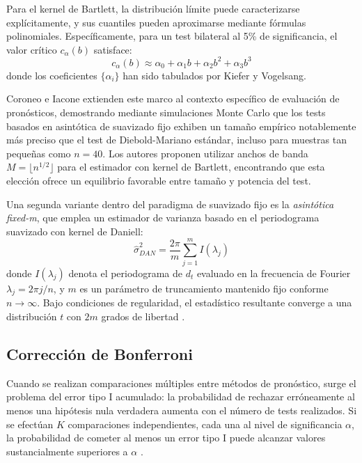 Para el kernel de Bartlett, la distribución límite puede caracterizarse explícitamente, y sus cuantiles pueden aproximarse mediante fórmulas polinomiales. Específicamente, para un test bilateral al 5\% de significancia, el valor crítico $c_\alpha(b)$ satisface:
\begin{equation}
c_\alpha(b) \approx \alpha_0 + \alpha_1 b + \alpha_2 b^2 + \alpha_3 b^3
\end{equation}
donde los coeficientes $\{\alpha_i\}$ han sido tabulados por Kiefer y Vogelsang.

Coroneo e Iacone \parencite{CoroneoIacone2020} extienden este marco al contexto específico de evaluación de pronósticos, demostrando mediante simulaciones Monte Carlo que los tests basados en asintótica de suavizado fijo exhiben un tamaño empírico notablemente más preciso que el test de Diebold-Mariano estándar, incluso para muestras tan pequeñas como $n=40$. Los autores proponen utilizar anchos de banda $M = \lfloor n^{1/2} \rfloor$ para el estimador con kernel de Bartlett, encontrando que esta elección ofrece un equilibrio favorable entre tamaño y potencia del test.

Una segunda variante dentro del paradigma de suavizado fijo es la \textit{asintótica fixed-m}, que emplea un estimador de varianza basado en el periodograma suavizado con kernel de Daniell:
\begin{equation}
\hat{\sigma}^2_{DAN} = \frac{2\pi}{m}\sum_{j=1}^m I(\lambda_j)
\end{equation}
donde $I(\lambda_j)$ denota el periodograma de $d_t$ evaluado en la frecuencia de Fourier $\lambda_j = 2\pi j/n$, y $m$ es un parámetro de truncamiento mantenido fijo conforme $n \to \infty$. Bajo condiciones de regularidad, el estadístico resultante converge a una distribución $t$ con $2m$ grados de libertad \parencite{CoroneoIacone2020}.


\subsection{Corrección de Bonferroni}
\label{subsec:bonferroni}

Cuando se realizan comparaciones múltiples entre métodos de pronóstico, surge el problema del error tipo I acumulado: la probabilidad de rechazar erróneamente al menos una hipótesis nula verdadera aumenta con el número de tests realizados. Si se efectúan $K$ comparaciones independientes, cada una al nivel de significancia $\alpha$, la probabilidad de cometer al menos un error tipo I puede alcanzar valores sustancialmente superiores a $\alpha$ \parencite{Dunn1961}.

